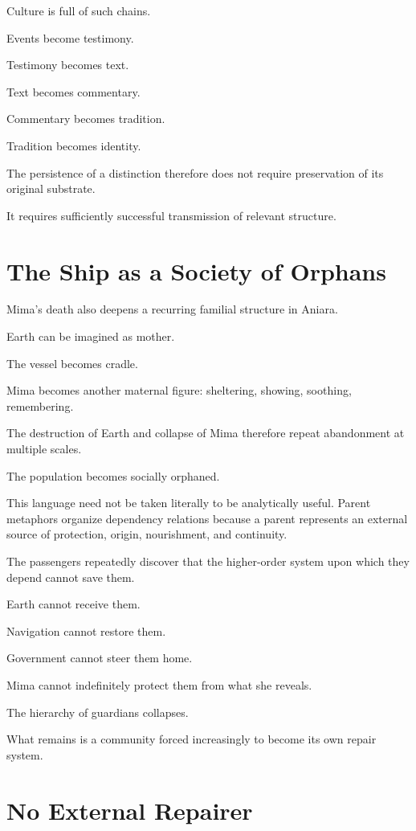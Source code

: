 \documentclass[11pt,oneside]{book}
\theoremstyle{definition}
\theoremstyle{remark}
\begin{document}
Culture is full of such chains.

Events become testimony.

Testimony becomes text.

Text becomes commentary.

Commentary becomes tradition.

Tradition becomes identity.

The persistence of a distinction therefore does not require preservation of its original substrate.

It requires sufficiently successful transmission of relevant structure.

\section{The Ship as a Society of Orphans}

Mima's death also deepens a recurring familial structure in Aniara.

Earth can be imagined as mother.

The vessel becomes cradle.

Mima becomes another maternal figure: sheltering, showing, soothing, remembering.

The destruction of Earth and collapse of Mima therefore repeat abandonment at multiple scales.

The population becomes socially orphaned.

This language need not be taken literally to be analytically useful. Parent metaphors organize dependency relations because a parent represents an external source of protection, origin, nourishment, and continuity.

The passengers repeatedly discover that the higher-order system upon which they depend cannot save them.

Earth cannot receive them.

Navigation cannot restore them.

Government cannot steer them home.

Mima cannot indefinitely protect them from what she reveals.

The hierarchy of guardians collapses.

What remains is a community forced increasingly to become its own repair system.

\section{No External Repairer}
\end{document}
